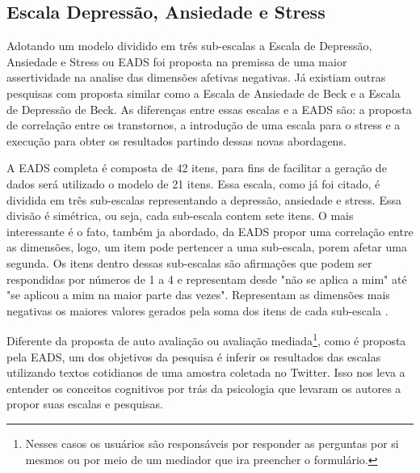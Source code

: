 \subsection{Escala Depressão, Ansiedade e Stress}
Adotando um modelo dividido em três sub-escalas a Escala de Depressão, Ansiedade e Stress ou EADS foi proposta na premissa de uma maior assertividade na analise das dimensões afetivas negativas. Já existiam outras pesquisas com proposta similar como a Escala de Ansiedade de Beck e a Escala de Depressão de Beck. As diferenças entre essas escalas e a EADS são: a proposta de correlação entre os transtornos, a introdução de uma escala para o stress e a execução para obter os resultados partindo dessas novas abordagens.

A EADS completa é composta de 42 itens, para fins de facilitar a geração de dados será utilizado o modelo de 21 itens. Essa escala, como já foi citado, é dividida em três sub-escalas representando a depressão, ansiedade e stress. Essa divisão é simétrica, ou seja, cada sub-escala contem sete itens. O mais interessante é o fato, também ja abordado, da EADS propor uma correlação entre as dimensões, logo, um item pode pertencer a uma sub-escala, porem afetar uma segunda. Os itens dentro dessas sub-escalas são afirmações que podem ser respondidas por números de 1 a 4 e representam desde "não se aplica a mim" até "se aplicou a mim na maior parte das vezes". Representam as dimensões mais negativas os maiores valores gerados pela soma dos itens de cada sub-escala \cite{lovibond1995structure, ribeiro2004contribuiccao}.

Diferente da proposta de auto avaliação ou avaliação mediada\footnote{Nesses casos os usuários são responsáveis por responder as perguntas por si mesmos ou por meio de um mediador que ira preencher o formulário.}, como é proposta pela EADS,  um dos objetivos da pesquisa é inferir os resultados das escalas utilizando textos cotidianos de uma amostra coletada no Twitter. Isso nos leva a entender os conceitos cognitivos por trás da psicologia que levaram os autores a propor suas escalas e pesquisas.
